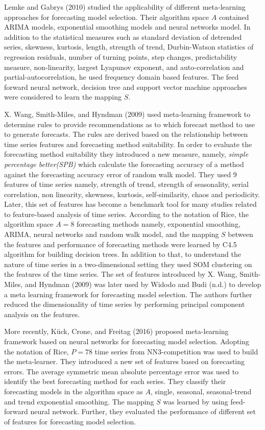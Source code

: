 \documentclass[11pt,]{article}
\theoremstyle{definition}
\theoremstyle{definition}
\theoremstyle{definition}
\theoremstyle{remark}
\begin{document}
Lemke and Gabrys (2010) studied the applicability of different
meta-learning approaches for forecasting model selection. Their
algorithm space \(A\) contained ARIMA models, exponential smoothing
models and neural networks model. In addition to the statistical
measures such as standard deviation of detrended series, skewness,
kurtosis, length, strength of trend, Durbin-Watson statistics of
regression residuals, number of turning points, step changes,
predictability measure, non-linearity, largest Lyapunov exponent, and
auto-correlation and partial-autocorrelation, he used frequency domain
based features. The feed forward neural network, decision tree and
support vector machine approaches were considered to learn the mapping
\(S\).

X. Wang, Smith-Miles, and Hyndman (2009) used meta-learning framework to
determine rules to provide recommendations as to which forecast method
to use to generate forecasts. The rules are derived based on the
relationship between time series features and forecasting method
suitability. In order to evaluate the forecasting method suitability
they introduced a new measure, namely, \emph{simple percentage
better(SPB)} which calculate the forecasting accuracy of a method
against the forecasting accuracy error of random walk model. They used 9
features of time series namely, strength of trend, strength of
seasonality, serial correlation, non linearity, skewness, kurtosis,
self-similarity, chaos and periodicity. Later, this set of features has
become a benchmark tool for many studies related to feature-based
analysis of time series. According to the notation of Rice, the
algorithm space \(A=8\) forecasting methods namely, exponential
smoothing, ARIMA, neural networks and random walk model, and the mapping
\(S\) between the features and performance of forecasting methods were
learned by C4.5 algorithm for building decision trees. In addition to
that, to understand the nature of time series in a two-dimensional
setting they used SOM clustering on the features of the time series. The
set of features introduced by X. Wang, Smith-Miles, and Hyndman (2009)
was later used by Widodo and Budi (n.d.) to develop a meta learning
framework for forecasting model selection. The authors further reduced
the dimensionality of time series by performing principal component
analysis on the features.

More recently, Kück, Crone, and Freitag (2016) proposed meta-learning
framework based on neural networks for forecasting model selection.
Adopting the notation of Rice, \(P = 78\) time series from
NN3-competition was used to build the meta-learner. They introduced a
new set of features based on forecasting errors. The average symmetric
mean absolute percentage error was used to identify the best forecasting
method for each series. They classify their forecasting models in the
algorithm space as \(A\), single, seasonal, seasonal-trend and trend
exponential smoothing. The mapping \(S\) was learned by using
feed-forward neural network. Further, they evaluated the performance of
different set of features for forecasting model selection.
\end{document}
